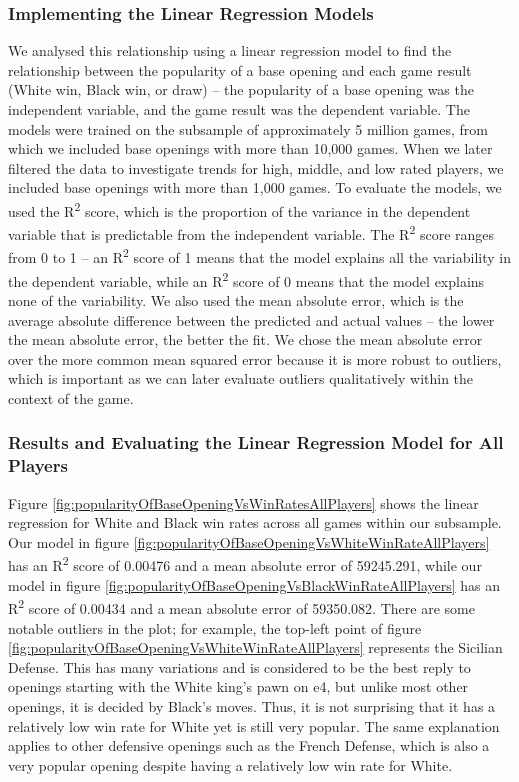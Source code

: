 \documentclass[a4paper, 11pt]{article}
\begin{document}
\subsubsection{Implementing the Linear Regression Models}
We analysed this relationship using a linear regression model to find the relationship between the popularity of a base opening and each game result (White win, Black win, or draw) -- the popularity of a base opening was the independent variable, and the game result was the dependent variable. The models were trained on the subsample of approximately 5 million games, from which we included base openings with more than 10,000 games. When we later filtered the data to investigate trends for high, middle, and low rated players, we included base openings with more than 1,000 games. To evaluate the models, we used the R\textsuperscript{2} score, which is the proportion of the variance in the dependent variable that is predictable from the independent variable. The R\textsuperscript{2} score ranges from 0 to 1 -- an R\textsuperscript{2} score of 1 means that the model explains all the variability in the dependent variable, while an R\textsuperscript{2} score of 0 means that the model explains none of the variability. We also used the mean absolute error, which is the average absolute difference between the predicted and actual values -- the lower the mean absolute error, the better the fit. We chose the mean absolute error over the more common mean squared error because it is more robust to outliers, which is important as we can later evaluate outliers qualitatively within the context of the game.

\subsubsection{Results and Evaluating the Linear Regression Model for All Players}
Figure \ref{fig:popularityOfBaseOpeningVsWinRatesAllPlayers} shows the linear regression for White and Black win rates across all games within our subsample. Our model in figure \ref{fig:popularityOfBaseOpeningVsWhiteWinRateAllPlayers} has an R\textsuperscript{2} score of 0.00476 and a mean absolute error of 59245.291, while our model in figure \ref{fig:popularityOfBaseOpeningVsBlackWinRateAllPlayers} has an R\textsuperscript{2} score of 0.00434 and a mean absolute error of 59350.082. There are some notable outliers in the plot; for example, the top-left point of figure \ref{fig:popularityOfBaseOpeningVsWhiteWinRateAllPlayers} represents the Sicilian Defense. This has many variations and is considered to be the best reply to openings starting with the White king's pawn on e4, but unlike most other openings, it is decided by Black's moves. Thus, it is not surprising that it has a relatively low win rate for White yet is still very popular. The same explanation applies to other defensive openings such as the French Defense, which is also a very popular opening despite having a relatively low win rate for White.
\end{document}
